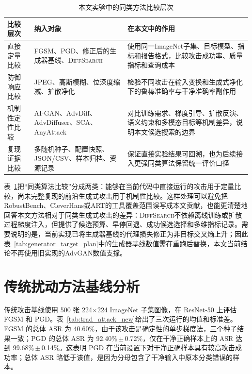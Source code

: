 \documentclass[type=bachelor,oneside]{fduthesis}
\newcommand{\methodname}{\textsc{DiffSearch}}
\newcommand{\tablefont}{\small}
\begin{document}
\begin{table}[htbp]
  \centering
  \caption{本文实验中的同类方法比较层次}
  \label{tab:method_compare_protocol}
  \tablefont
  \setlength{\tabcolsep}{4pt}
  \renewcommand{\arraystretch}{1.15}
  \begin{tabularx}{\textwidth}{lXX}
    \toprule
    比较层次 & 纳入对象 & 在本文中的作用 \\
    \midrule
    直接定量比较 & FGSM、PGD、修正后的生成器基线、\methodname & 使用同一ImageNet子集、目标模型、指标和报告格式，比较攻击成功率、质量指标和查询成本 \\
    防御响应比较 & JPEG、高斯模糊、位深度缩减、扩散净化 & 检验不同攻击在输入变换和生成式净化下的鲁棒准确率与干净准确率副作用 \\
    机制性定性比较 & AI-GAN、AdvDiff、AdvDiffuser、SCA、AnyAttack & 对比训练需求、梯度引导、扩散反演、语义约束和多模态目标等机制差异，说明本文候选搜索的边界 \\
    复现证据比较 & 多随机种子、配置快照、JSON/CSV、样本归档、资源记录 & 保证直接实验结果可回溯，也为后续接入更强同类算法保留统一评价口径 \\
    \bottomrule
  \end{tabularx}
\end{table}

表~\ref{tab:method_compare_protocol}把“同类算法比较”分成两类：能够在当前代码中直接运行的攻击用于定量比较，尚未完整复现的前沿生成式攻击用于机制性比较。这样处理可以避免把RobustBench、CleverHans或ART的工具覆盖范围误写成本文贡献，也能更清楚地回答本文方法相对于同类生成式攻击的差异：\methodname 不依赖离线训练或扩散过程梯度注入，但提供了候选预算、早停回退、成功候选选择和多维指标记录。需要说明的是，当前实现已将生成器基线的代理损失修正为非目标交叉熵上升；因此表~\ref{tab:generator_target_plan}中的生成器基线数值需在重跑后替换，本文当前结论不再使用旧实现的AdvGAN数值支撑。

\section{传统扰动方法基线分析}

传统攻击基线使用 500 张 224$\times$224 ImageNet 子集图像，在 ResNet-50 上评估 FGSM 和 PGD。表~\ref{tab:trad_attack_new}给出了三次运行的均值和标准差。FGSM 的总体 ASR 为 40.60\%，由于该攻击是确定性的单步梯度法，三个种子结果一致；PGD 的总体 ASR 为 92.40\%\,$\pm$\,0.72\%，仅在干净正确样本上的 ASR 达到 99.68\%\,$\pm$\,0.14\%。这表明 PGD 在当前设置下对干净正确样本具有较高攻击成功率；总体 ASR 略低于该值，是因为分母包含了干净输入中原本分类错误的样本。
\end{document}
